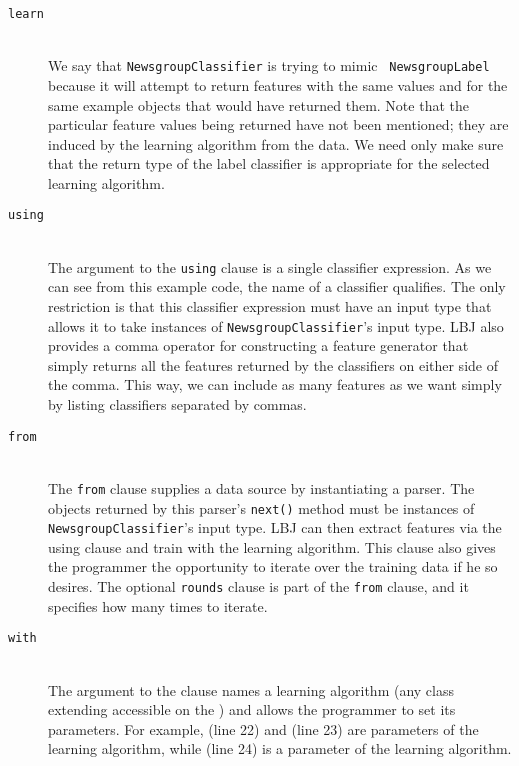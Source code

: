 \begin{description}

\item[{\tt learn}]\hfill\\
%
{\justify We say that {\tt NewsgroupClassifier} is trying to mimic {\tt
NewsgroupLabel} because it will attempt to return features with the same
values and for the same example objects that  would have
returned them.  Note that the particular feature values being returned have
not been mentioned; they are induced by the learning algorithm from the data.
We need only make sure that the return type of the label classifier is
appropriate for the selected learning algorithm.}

\item[{\tt using}]\hfill\\
%
The argument to the {\tt using} clause is a single classifier expression.  As
we can see from this example code, the name of a classifier qualifies.  The
only restriction is that this classifier expression must have an input type
that allows it to take instances of {\tt NewsgroupClassifier}'s input type.
LBJ also provides a comma operator for constructing a feature generator that
simply returns all the features returned by the classifiers on either side of
the comma.  This way, we can include as many features as we want simply by
listing classifiers separated by commas.
%

\item[{\tt from}]\hfill\\
%
The {\tt from} clause supplies a data source by instantiating a parser.  The
objects returned by this parser's {\tt next()} method must be instances of
{\tt NewsgroupClassifier}'s input type.  LBJ can then extract features via the
using clause and train with the learning algorithm.  This clause also gives
the programmer the opportunity to iterate over the training data if he so
desires.  The optional {\tt rounds} clause is part of the {\tt from} clause,
and it specifies how many times to iterate.

\item[{\tt with}]\hfill\\
%
The argument to the  clause names a learning algorithm (any class
extending  accessible on the ) and
allows the programmer to set its parameters.  For example, 
(line 22) and  (line 23) are parameters of the
 learning algorithm, while  (line
24) is a parameter of the  learning algorithm.

\end{description}

